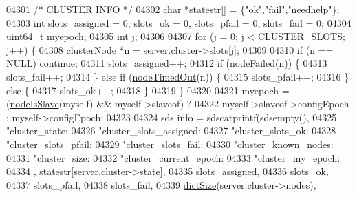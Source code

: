 \begin{DoxyCode}
{{{{{{{{{{{{{{{{{{{{{{{{{{{{{{{{{{{{{{{{{{{{{{{{{{{{{{{{{{{{{{{{{{{{{{{{{{{{{{{{{{{{{04301         \textcolor{comment}{/* CLUSTER INFO */}
04302         \textcolor{keywordtype}{char} *statestr[] = \{\textcolor{stringliteral}{"ok"},\textcolor{stringliteral}{"fail"},\textcolor{stringliteral}{"needhelp"}\};
04303         \textcolor{keywordtype}{int} slots\_assigned = 0, slots\_ok = 0, slots\_pfail = 0, slots\_fail = 0;
04304         uint64\_t myepoch;
04305         \textcolor{keywordtype}{int} j;
04306 
04307         \textcolor{keywordflow}{for} (j = 0; j < \hyperlink{cluster_8h_aa3e2cb951eebb16725ecc3f5beefd9fd}{CLUSTER\_SLOTS}; j++) \{
04308             clusterNode *n = server.cluster->slots[j];
04309 
04310             \textcolor{keywordflow}{if} (n == NULL) \textcolor{keywordflow}{continue};
04311             slots\_assigned++;
04312             \textcolor{keywordflow}{if} (\hyperlink{cluster_8h_a6a31c614ff4f5ac8ebaa630b0a921c3d}{nodeFailed}(n)) \{
04313                 slots\_fail++;
04314             \} \textcolor{keywordflow}{else} \textcolor{keywordflow}{if} (\hyperlink{cluster_8h_ac0ab1cbdbc2a49b30c98d73640476e32}{nodeTimedOut}(n)) \{
04315                 slots\_pfail++;
04316             \} \textcolor{keywordflow}{else} \{
04317                 slots\_ok++;
04318             \}
04319         \}
04320 
04321         myepoch = (\hyperlink{cluster_8h_a3c99881f6892130c902b42b1f84a0e11}{nodeIsSlave}(myself) && myself->slaveof) ?
04322                   myself->slaveof->configEpoch : myself->configEpoch;
04323 
04324         sds info = sdscatprintf(sdsempty(),
04325             \textcolor{stringliteral}{"cluster\_state:%
04326             \textcolor{stringliteral}{"cluster\_slots\_assigned:%
04327             \textcolor{stringliteral}{"cluster\_slots\_ok:%
04328             \textcolor{stringliteral}{"cluster\_slots\_pfail:%
04329             \textcolor{stringliteral}{"cluster\_slots\_fail:%
04330             \textcolor{stringliteral}{"cluster\_known\_nodes:%
04331             \textcolor{stringliteral}{"cluster\_size:%
04332             \textcolor{stringliteral}{"cluster\_current\_epoch:%
04333             \textcolor{stringliteral}{"cluster\_my\_epoch:%
04334             , statestr[server.cluster->state],
04335             slots\_assigned,
04336             slots\_ok,
04337             slots\_pfail,
04338             slots\_fail,
04339             \hyperlink{dict_8h_af193430dd3d5579a52b194512f72c1f0}{dictSize}(server.cluster->nodes),
}}}}}}}}}}}}}}}}}}}}}}}}}}}}}}}}}}}}}}}}}}}}}}}}}}}}}}}}}}}}}}}}}}}}}}}}}}}}}}}}}}}}}}}}}}}}}}
\end{DoxyCode}
